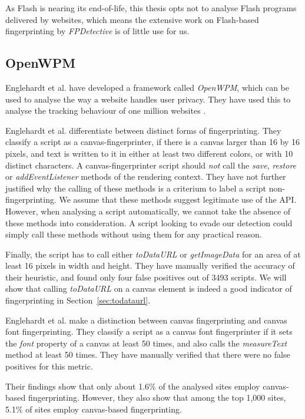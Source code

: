 \documentclass[
    fontsize=12pt,
    headings=small,
    parskip=half,
    bibliography=totoc,
    numbers=noenddot,
    open=any
    ]{scrreprt}
\begin{document}
As Flash is nearing its end-of-life, this thesis opts not to analyse Flash programs
delivered by websites, which means the extensive work on Flash-based fingerprinting
by \textit{FPDetective} is of little use for us.


\subsection{OpenWPM}
\label{section:openwpm}
Englehardt et al. have developed a framework called \textit{OpenWPM}, which can be used to analyse the way a website
handles user privacy. They have used this to analyse the tracking behaviour of one million websites
\cite{DBLP:conf/ccs/EnglehardtN16,englehardt2016census}.

Englehardt et al. differentiate between distinct forms of fingerprinting.
They classify a script as a canvas-fingerprinter, if there is a canvas larger than 16 by 16 pixels, and text is
written to it in either at least two different colors, or with 10 distinct characters.
A canvas-fingerprinter script should \textit{not} call the \textit{save}, \textit{restore} or \textit{addEventListener}
methods of the rendering context.
They have not further justified why the calling of these methods is a criterium to label a script non-fingerprinting.
We assume that these methods suggest legitimate use of the API. However, when analysing a script automatically,
we cannot take the absence of these methods into consideration. A script looking to evade our detection
could simply call these methods without using them for any practical reason.

Finally, the script has to call either \textit{toDataURL}
or \textit{getImageData} for an area of at least 16 pixels in width and height.
They have manually verified the accuracy of their heuristic, and found only four false positives
out of 3493 scripts.
We will show that calling \textit{toDataURL} on a canvas element is indeed a good indicator of fingerprinting
in Section~\ref{sec:todataurl}.

Englehardt et al. make a distinction between canvas fingerprinting and canvas font fingerprinting.
They classify a script as a canvas font fingerprinter if it sets the \textit{font} property
of a canvas at least 50 times, and also calls the \textit{measureText} method at least 50 times.
They have manually verified that there were no false positives for this metric.

Their findings show that only about 1.6\% of the analysed sites
employ canvas-based fingerprinting. However, they also show that among the top 1,000 sites,
5.1\% of sites employ canvas-based fingerprinting.
\end{document}
